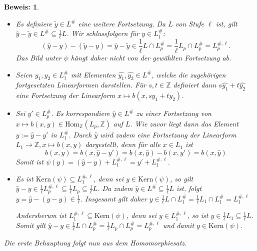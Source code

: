 \documentclass[12pt,a4paper,halfparskip,headsepline,bibtotocnumbered]{scrreprt}
\theoremstyle{nummermitklammern}
\theoremstyle{nonumberbreak}
\newtheorem{beweis}{Beweis:}
\newcommand{\Z}{\mathbb{Z}}
\newcommand{\Kern}{\text{Kern}}
\begin{document}
\begin{beweis}
	\begin{itemize}[align=left, leftmargin = *]
		\item[Wohldefiniert:] Es definiere $\tilde{y} \in L^\#$ eine weitere Fortsetzung. Da $L$ von Stufe $\ell$ ist, gilt $\hat{y} - \tilde{y} \in L^\# \subseteq \frac{1}{\ell} L$. Wir schlussfolgern für $y \in L_1^\#$:
			\begin{equation*}
				(\hat{y} - y) - (\tilde{y} - y) = \hat{y} - \tilde{y} \in \frac{1}{\ell} L \cap L_p^\# = \frac{1}{\ell} L_p \cap L_p^\# = L_p^{\#,\ell}.
			\end{equation*}
			Das Bild unter $\psi$ hängt daher nicht von der gewählten Fortsetzung ab.
		\item[Linearität:] Seien $y_1, y_2 \in L_1^\#$ mit Elementen $\hat{y_1}, \hat{y_2} \in L^\#$, welche die zugehörigen fortgesetzten Linearformen darstellen. Für $s,t \in \Z$ definiert dann $s \hat{y_1} + t \hat{y_2}$ eine Fortsetzung der Linearform $x \mapsto b(x, s y_1 + t y_2)$.
		\item[Surjektivität:] Sei $y' \in L_p^\#$. Es korrespondiere $\hat{y} \in L^\#$ zu einer Fortsetzung von\linebreak
		$x \mapsto b(x,y) \in \text{Hom}_\Z(L_p, \Z)$ auf $L$. Wie zuvor liegt dann das Element $y := \hat{y} - y'$ in $L_1^\#$. Durch $\hat{y}$ wird zudem eine Fortsetzung der Linearform $L_1 \rightarrow \Z, x \mapsto b(x,y)$ dargestellt, denn für alle $x \in L_1$ ist
			\begin{equation*}
				b(x,y) = b(x, \hat{y} - y') = b(x, \hat{y}) - b(x, y') = b(x, \hat{y})
			\end{equation*}
			Somit ist $\psi(y) = (\hat{y} - y) + L_1^{\#, \ell} = y' + L_1^{\#, \ell}$.
		\item[Kern:] Es ist $\Kern(\psi) \subseteq L_1^{\#, \ell}$, denn sei $y \in \Kern(\psi)$, so gilt $\hat{y} - y \in \frac{1}{\ell}L_p^{\#, \ell} \subseteq \frac{1}{\ell} L_p \subseteq \frac{1}{\ell} L$. Da zudem $\hat{y} \in L^\# \subseteq \frac{1}{\ell} L$ ist, folgt $y = \hat{y} - (\hat{y} - y) \in \frac{1}{\ell}$. Insgesamt gilt daher\linebreak
			$y \in \frac{1}{\ell}L \cap L_1^\# = \frac{1}{\ell} L_1 \cap L_1^\# = L_1^{\#, \ell}$\par
			Andersherum ist $L_1^{\#, \ell} \subseteq \Kern(\psi)$, denn sei $y \in L_1^{\#, \ell}$, so ist $y \in \frac{1}{\ell} L_1 \subseteq \frac{1}{\ell}L$. Somit gilt $\hat{y} - y \in \frac{1}{\ell} L \cap L_p^\# = \frac{1}{\ell} L_p \cap L_p^\# = L_p^{\#, \ell}$ und damit $y \in \Kern(\psi)$.
	\end{itemize}
	Die erste Behauptung folgt nun aus dem Homomorphiesatz.\par
	

\end{beweis}
\end{document}
